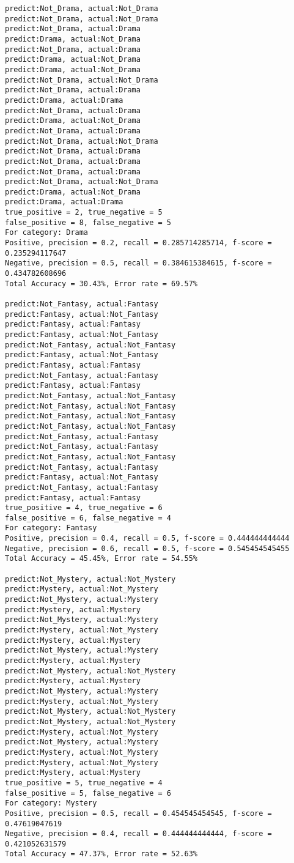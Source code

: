 \documentclass{article}
\begin{document}
\begin{lstlisting}
predict:Not_Drama, actual:Not_Drama
predict:Not_Drama, actual:Not_Drama
predict:Not_Drama, actual:Drama
predict:Drama, actual:Not_Drama
predict:Not_Drama, actual:Drama
predict:Drama, actual:Not_Drama
predict:Drama, actual:Not_Drama
predict:Not_Drama, actual:Not_Drama
predict:Not_Drama, actual:Drama
predict:Drama, actual:Drama
predict:Not_Drama, actual:Drama
predict:Drama, actual:Not_Drama
predict:Not_Drama, actual:Drama
predict:Not_Drama, actual:Not_Drama
predict:Not_Drama, actual:Drama
predict:Not_Drama, actual:Drama
predict:Not_Drama, actual:Drama
predict:Not_Drama, actual:Not_Drama
predict:Drama, actual:Not_Drama
predict:Drama, actual:Drama
true_positive = 2, true_negative = 5
false_positive = 8, false_negative = 5
For category: Drama
Positive, precision = 0.2, recall = 0.285714285714, f-score = 0.235294117647 
Negative, precision = 0.5, recall = 0.384615384615, f-score = 0.434782608696 
Total Accuracy = 30.43%, Error rate = 69.57%

predict:Not_Fantasy, actual:Fantasy
predict:Fantasy, actual:Not_Fantasy
predict:Fantasy, actual:Fantasy
predict:Fantasy, actual:Not_Fantasy
predict:Not_Fantasy, actual:Not_Fantasy
predict:Fantasy, actual:Not_Fantasy
predict:Fantasy, actual:Fantasy
predict:Not_Fantasy, actual:Fantasy
predict:Fantasy, actual:Fantasy
predict:Not_Fantasy, actual:Not_Fantasy
predict:Not_Fantasy, actual:Not_Fantasy
predict:Not_Fantasy, actual:Not_Fantasy
predict:Not_Fantasy, actual:Not_Fantasy
predict:Not_Fantasy, actual:Fantasy
predict:Not_Fantasy, actual:Fantasy
predict:Not_Fantasy, actual:Not_Fantasy
predict:Not_Fantasy, actual:Fantasy
predict:Fantasy, actual:Not_Fantasy
predict:Not_Fantasy, actual:Fantasy
predict:Fantasy, actual:Fantasy
true_positive = 4, true_negative = 6
false_positive = 6, false_negative = 4
For category: Fantasy
Positive, precision = 0.4, recall = 0.5, f-score = 0.444444444444 
Negative, precision = 0.6, recall = 0.5, f-score = 0.545454545455 
Total Accuracy = 45.45%, Error rate = 54.55%

predict:Not_Mystery, actual:Not_Mystery
predict:Mystery, actual:Not_Mystery
predict:Not_Mystery, actual:Mystery
predict:Mystery, actual:Mystery
predict:Not_Mystery, actual:Mystery
predict:Mystery, actual:Not_Mystery
predict:Mystery, actual:Mystery
predict:Not_Mystery, actual:Mystery
predict:Mystery, actual:Mystery
predict:Not_Mystery, actual:Not_Mystery
predict:Mystery, actual:Mystery
predict:Not_Mystery, actual:Mystery
predict:Mystery, actual:Not_Mystery
predict:Not_Mystery, actual:Not_Mystery
predict:Not_Mystery, actual:Not_Mystery
predict:Mystery, actual:Not_Mystery
predict:Not_Mystery, actual:Mystery
predict:Mystery, actual:Not_Mystery
predict:Mystery, actual:Not_Mystery
predict:Mystery, actual:Mystery
true_positive = 5, true_negative = 4
false_positive = 5, false_negative = 6
For category: Mystery
Positive, precision = 0.5, recall = 0.454545454545, f-score = 0.47619047619 
Negative, precision = 0.4, recall = 0.444444444444, f-score = 0.421052631579 
Total Accuracy = 47.37%, Error rate = 52.63%


\end{lstlisting}
\end{document}
